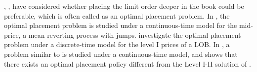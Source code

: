 \documentclass[11pt]{article}
\theoremstyle{plain}
\numberwithin{equation}{section}
\begin{document}
\citet{cartea2014modelling}, \citet{GDR:2017}, \citet{FLP:2018}
have considered whether placing the limit order deeper in the book could be preferable, which is often called as an optimal placement problem. In \cite{cartea2014modelling}, the optimal placement problem is studied under a continuous-time model for the mid-price, a mean-reverting process with jumps. \cite{GDR:2017} investigate the optimal placement problem under a discrete-time model for the level I prices of a LOB. In \cite{FLP:2018}, a problem similar to \cite{GDR:2017} is studied under a continuous-time model, and shows that there exists an optimal placement policy different from the Level I-II solution of \cite{GDR:2017}.  
\end{document}
